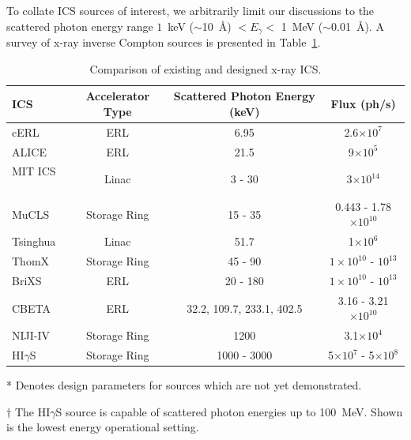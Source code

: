 \documentclass[../main.tex]{subfiles}
\begin{document}
To collate ICS sources of interest, we arbitrarily limit our discussions to the scattered photon energy range $1$~\si{\kilo\electronvolt} ($\sim$10~\si{\angstrom}) $< E_{\gamma} <$ 1~\si{\mega\electronvolt} ($\sim$0.01~\si{\angstrom}). A survey of x-ray inverse Compton sources is presented in Table~\ref{tab:xray_ICS_comparison}.

\begin{table}[!h]
\caption{Comparison of existing and designed x-ray ICS. \textcolor{}{}}
\begin{threeparttable}
\begin{tabular}{lccc}
\hline\hline
ICS & Accelerator Type & Scattered Photon Energy (\si{\kilo\electronvolt}) & Flux (ph/\si{\second}) \\
\hline
cERL \cite{akagi2016narrow} & ERL & 6.95 & 2.6$\times 10^{7}$ \\ 
ALICE \cite{priebe2008inverse,priebe2010first} & ERL & 21.5 & 9$\times 10^{5}$ \\
MIT ICS\tnote{*} ~\cite{graves2014compact} & Linac & 3 - 30 & 3$\times 10^{14}$ \\
MuCLS \cite{eggl2016munich} & Storage Ring & 15 - 35 & 0.443 - 1.78$\times 10^{10}$ \\ 
Tsinghua \cite{du2013generation} & Linac & 51.7 & 1$\times 10^{6}$ \\
ThomX\tnote{*} ~\cite{variola2014thomx,dupraz2020thomx} & Storage Ring & 45 - 90 & $1\times 10^{10}$ - $10^{13}$ \\
BriXS\tnote{*} ~\cite{faillace2019status,drebot2019brixs,cardarelli2020brixs} & ERL & 20 - 180 & $1\times 10^{10}$ - $10^{13}$ \\
CBETA\tnote{*} & ERL & 32.2, 109.7, 233.1, 402.5 & 3.16 - 3.21$\times 10^{10}$ \\ 
NIJI-IV \cite{sei2017demonstration} & Storage Ring & 1200 & 3.1$\times 10^{4}$ \\ 
HI$\gamma$S\tnote{$\dagger$} ~\cite{weller2009research} & Storage Ring & 1000 - 3000 & 5$\times 10^{7}$ - 5$\times 10^{8}$ \\
\hline\hline
\end{tabular}
\begin{tablenotes}
\item[*]{Denotes design parameters for sources which are not yet demonstrated.}
\item[$\dagger$]{The HI$\gamma$S source is capable of scattered photon energies up to 100~MeV. Shown is the lowest energy operational setting.}
\end{tablenotes}
\end{threeparttable}
\label{tab:xray_ICS_comparison}
\end{table}
\end{document}
